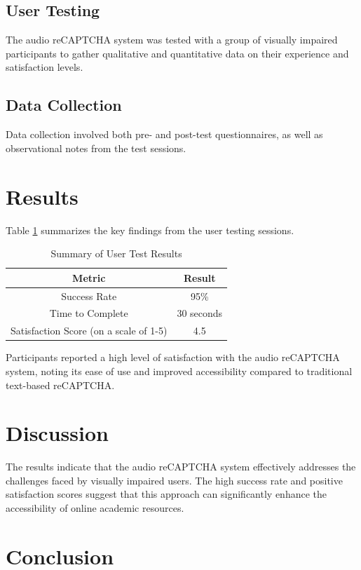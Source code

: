 \documentclass{article}
\begin{document}
\subsection{User Testing}
The audio reCAPTCHA system was tested with a group of visually impaired participants to gather qualitative and quantitative data on their experience and satisfaction levels.

\subsection{Data Collection}
Data collection involved both pre- and post-test questionnaires, as well as observational notes from the test sessions.

\section{Results}
\label{sec:results}

Table \ref{tab:results} summarizes the key findings from the user testing sessions.

\begin{table}[ht]
\centering
\begin{tabular}{|c|c|}
\hline
\textbf{Metric} & \textbf{Result} \\
\hline
Success Rate & 95\% \\
Time to Complete & 30 seconds \\
Satisfaction Score (on a scale of 1-5) & 4.5 \\
\hline
\end{tabular}
\caption{Summary of User Test Results}
\label{tab:results}
\end{table}

Participants reported a high level of satisfaction with the audio reCAPTCHA system, noting its ease of use and improved accessibility compared to traditional text-based reCAPTCHA.

\section{Discussion}
\label{sec:discussion}

The results indicate that the audio reCAPTCHA system effectively addresses the challenges faced by visually impaired users. The high success rate and positive satisfaction scores suggest that this approach can significantly enhance the accessibility of online academic resources.

\section{Conclusion}
\label{sec:conclusion}
\end{document}
